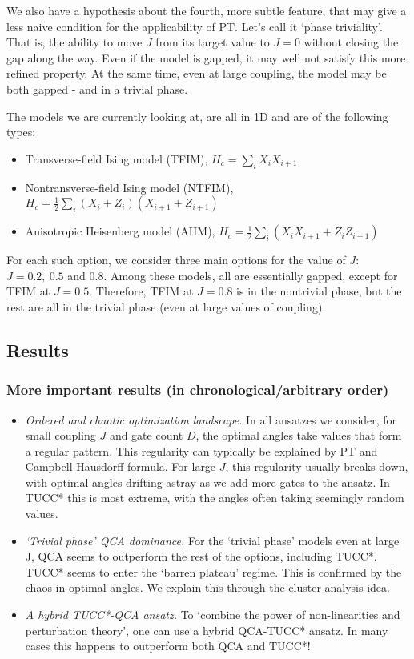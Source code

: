 \documentclass[10pt, a4paper]{article}
\begin{document}
We also have a hypothesis about the fourth, more subtle feature, that may give a less naive condition for the applicability of PT. Let's call it `phase triviality'. That is, the ability to move $J$ from its target value to $J=0$ without closing the gap along the way. Even if the model is gapped, it may well not satisfy this more refined property. At the same time, even at large coupling, the model may be both gapped - and in a trivial phase.

The models we are currently looking at, are all in 1D and are of the following types:
\begin{itemize}
\item Transverse-field Ising model (TFIM), $H_c=\sum_i X_i X_{i+1}$
\item Nontransverse-field Ising model (NTFIM), $H_c=\frac{1}{2}\sum_i (X_i+Z_i) (X_{i+1}+Z_{i+1})$
\item Anisotropic Heisenberg model (AHM),  $H_c=\frac{1}{2}\sum_i (X_iX_{i+1}+Z_iZ_{i+1})$
\end{itemize}

For each such option, we consider three main options for the value of $J$: $J=0.2,~0.5$ and $0.8$. Among these models, all are essentially gapped, except for TFIM at $J=0.5$. Therefore, TFIM at $J=0.8$ is in the nontrivial phase, but the rest are all in the trivial phase (even at large values of coupling).

\subsection*{Results}
\subsubsection*{More important results (in chronological/arbitrary order)}

\begin{itemize}
\item \textit{Ordered and chaotic optimization landscape.} In all ansatzes we consider, for small coupling $J$ and gate count $D$, the optimal angles take values that form a regular pattern. This regularity can typically be explained by PT and Campbell-Hausdorff formula. For large $J$, this regularity usually breaks down, with optimal angles drifting astray as we add more gates to the ansatz. In TUCC* this is most extreme, with the angles often taking seemingly random values. 
\item \textit{`Trivial phase' QCA dominance.} For the `trivial phase' models even at large J, QCA seems to outperform the rest of the options, including TUCC*. TUCC* seems to enter the `barren plateau' regime. This is confirmed by the chaos in optimal angles. We explain this through the cluster analysis idea.
\item \textit{A hybrid TUCC*-QCA ansatz.} To `combine the power of non-linearities and perturbation theory', one can use a hybrid QCA-TUCC* ansatz. In many cases this happens to outperform both QCA and TUCC*!
\end{itemize}
\end{document}
